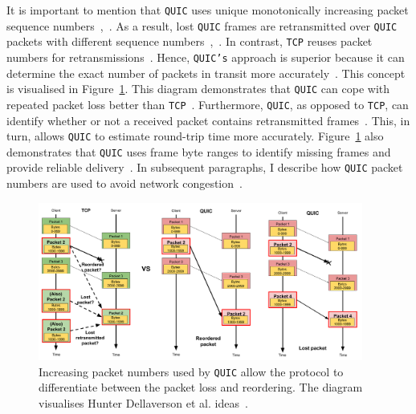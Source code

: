 \documentclass[12pt,a4paper]{report}
\begin{document}
\begin{itemize}
    
    
    
    It is important to mention that \texttt{QUIC} uses unique monotonically increasing packet sequence numbers~\cite{UnderstandQUIC, The_QUIC_Transport_Protocol_Design_and_Internet-Scale_Deployment},~\cite[Section~4.2]{ietf-quic-recovery-32}.
    As a result, lost \texttt{QUIC} frames are retransmitted over \texttt{QUIC} packets with different sequence numbers~\cite[Section~4]{ietf-quic-recovery-32},~\cite{UnderstandQUIC}.
    In contrast, \texttt{TCP} reuses packet numbers for retransmissions~\cite[Section~4]{ietf-quic-recovery-32}.
    Hence, \texttt{QUIC's} approach is superior because it can determine the exact number of packets in transit more accurately~\cite{UnderstandQUIC}.
    This concept is visualised in Figure~\ref{fig:Impact_of_increasing_pkt_numbers}.
    This diagram demonstrates that \texttt{QUIC} can cope with repeated packet loss better than \texttt{TCP}~\cite{UnderstandQUIC}.
    Furthermore, \texttt{QUIC}, as opposed to \texttt{TCP}, can identify whether or not a received packet contains retransmitted frames~\cite{UnderstandQUIC}.
    This, in turn, allows \texttt{QUIC} to estimate round-trip time more accurately.
    Figure~\ref{fig:Impact_of_increasing_pkt_numbers} also demonstrates that \texttt{QUIC} uses frame byte ranges to identify missing frames and provide reliable delivery~\cite{UnderstandQUIC}.
    In subsequent paragraphs, I describe how \texttt{QUIC} packet numbers are used to avoid network congestion~\cite{UnderstandQUIC}.
    
    \begin{figure}[H]
    \centering
    \includegraphics[width=0.95\textwidth]{figs/Impact_of_increasing_pkt_numbers.png}
    \caption[Increasing packet numbers used by \texttt{QUIC} allow the protocol to differentiate between the packet loss and reordering]{Increasing packet numbers used by \texttt{QUIC} allow the protocol to differentiate between the packet loss and reordering. The diagram visualises Hunter Dellaverson et al. ideas~\cite{UnderstandQUIC}.}
    \label{fig:Impact_of_increasing_pkt_numbers}
    \end{figure}
    

\end{itemize}
\end{document}
